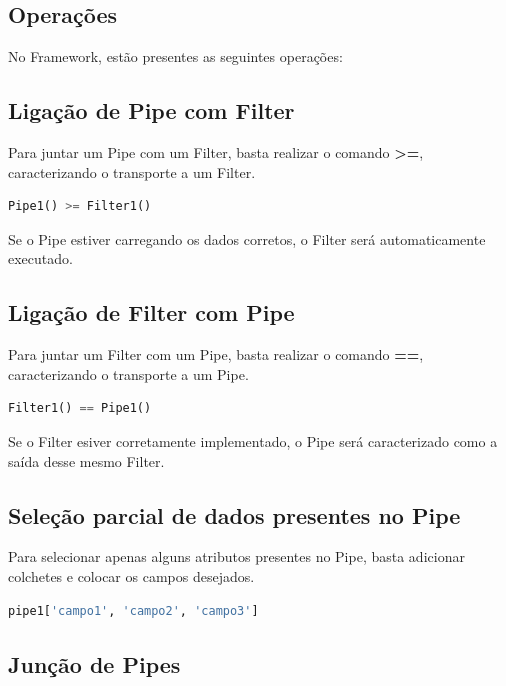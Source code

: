 \documentclass[Portugues,Final]{ic-tese-v3}
\begin{document}
\subsection{Operações}

No Framework, estão presentes as seguintes operações:

\subsection{Ligação de Pipe com Filter}

Para juntar um Pipe com um Filter, basta realizar o comando \textbf{>=}, caracterizando o transporte a um Filter.

\begin{lstlisting}[language=Python, label=cod:PipeToFilter]
    Pipe1() >= Filter1()
\end{lstlisting}

Se o Pipe estiver carregando os dados corretos, o Filter será automaticamente executado.

\subsection{Ligação de Filter com Pipe}

Para juntar um Filter com um Pipe, basta realizar o comando \textbf{==}, caracterizando o transporte a um Pipe.

\begin{lstlisting}[language=Python, label=cod:FilterToPipe]
    Filter1() == Pipe1()
\end{lstlisting}

Se o Filter esiver corretamente implementado, o Pipe será caracterizado como a saída desse mesmo Filter.

\subsection{Seleção parcial de dados presentes no Pipe}

Para selecionar apenas alguns atributos presentes no Pipe, basta adicionar colchetes e colocar os campos desejados.

\begin{lstlisting}[language=Python, label=cod:PartialPipe]
    pipe1['campo1', 'campo2', 'campo3']
\end{lstlisting}

\subsection{Junção de Pipes}
\end{document}
